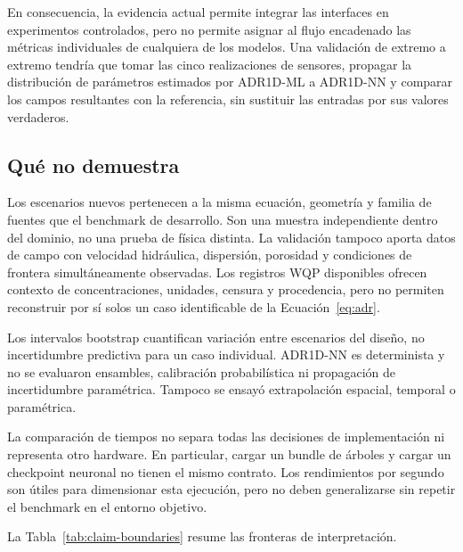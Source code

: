 \documentclass[11pt,a4paper]{article}
\begin{document}
En consecuencia, la evidencia actual permite integrar las interfaces en
experimentos controlados, pero no permite asignar al flujo encadenado las
métricas individuales de cualquiera de los modelos. Una validación de extremo
a extremo tendría que tomar las cinco realizaciones de sensores, propagar la
distribución de parámetros estimados por ADR1D-ML a ADR1D-NN y comparar los
campos resultantes con la referencia, sin sustituir las entradas por sus valores
verdaderos.

\subsection{Qué no demuestra}

Los escenarios nuevos pertenecen a la misma ecuación, geometría y familia de
fuentes que el benchmark de desarrollo. Son una muestra independiente dentro
del dominio, no una prueba de física distinta. La validación tampoco aporta
datos de campo con velocidad hidráulica, dispersión, porosidad y condiciones de
frontera simultáneamente observadas. Los registros WQP disponibles ofrecen
contexto de concentraciones, unidades, censura y procedencia, pero no permiten
reconstruir por sí solos un caso identificable de la Ecuación~\eqref{eq:adr}.

Los intervalos bootstrap cuantifican variación entre escenarios del diseño, no
incertidumbre predictiva para un caso individual. ADR1D-NN es determinista y no
se evaluaron ensambles, calibración probabilística ni propagación de
incertidumbre paramétrica. Tampoco se ensayó extrapolación espacial, temporal o
paramétrica.

La comparación de tiempos no separa todas las decisiones de implementación ni
representa otro hardware. En particular, cargar un bundle de árboles y cargar
un checkpoint neuronal no tienen el mismo contrato. Los rendimientos por
segundo son útiles para dimensionar esta ejecución, pero no deben generalizarse
sin repetir el benchmark en el entorno objetivo.

La Tabla~\ref{tab:claim-boundaries} resume las fronteras de interpretación.
\end{document}
